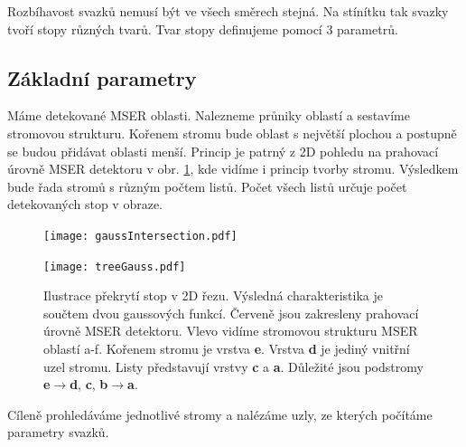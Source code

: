 Rozbíhavost svazků nemusí být ve všech směrech stejná. Na stínítku tak svazky tvoří stopy různých tvarů. Tvar stopy definujeme pomocí 3 parametrů.

\subsection{Základní parametry}

Máme detekované MSER oblasti. Nalezneme průniky oblastí a sestavíme stromovou strukturu. Kořenem stromu bude oblast s největší plochou a postupně se budou přidávat oblasti menší. Princip je patrný z 2D pohledu na prahovací úrovně MSER detektoru v obr. \ref{fig:gaussIntersection}, kde vidíme i princip tvorby stromu. Výsledkem bude řada stromů s různým počtem listů. Počet všech listů určuje počet detekovaných stop v obraze.

\begin{figure}[htbp]
    \centering
	\begin{minipage}[c]{0.78 \textwidth}
    \texttt{[image: gaussIntersection.pdf]}
    \end{minipage}
    \begin{minipage}[c]{0.16 \textwidth}
    \texttt{[image: treeGauss.pdf]}
    \end{minipage}
    
    
     \caption[]{Ilustrace překrytí stop v 2D řezu. Výsledná charakteristika je součtem dvou gaussových funkcí. Červeně jsou zakresleny prahovací úrovně MSER detektoru. Vlevo vidíme stromovou strukturu MSER oblastí a-f. Kořenem stromu je vrstva \textbf{e}. Vrstva \textbf{d} je jediný vnitřní uzel stromu. Listy představují vrstvy \textbf{c} a \textbf{a}. Důležité jsou podstromy \textbf{e}$\rightarrow$\textbf{d}, \textbf{c}, \textbf{b}$\rightarrow$\textbf{a}.}
        \label{fig:gaussIntersection}
\end{figure}

Cíleně prohledáváme jednotlivé stromy a nalézáme uzly, ze kterých počítáme parametry svazků.

